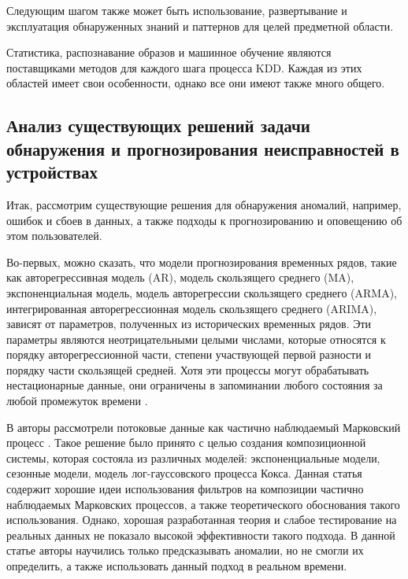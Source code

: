 Следующим шагом также может быть использование, развертывание и эксплуатация обнаруженных знаний и паттернов для целей предметной области.

Статистика, распознавание образов и машинное обучение являются поставщиками методов для каждого шага процесса KDD.
Каждая из этих областей имеет свои особенности, однако все они имеют также много общего.

\subsection{Анализ существующих решений задачи обнаружения и прогнозирования неисправностей в устройствах}

Итак, рассмотрим существующие решения для обнаружения аномалий, например, ошибок и сбоев в данных, а также
подходы к прогнозированию и оповещению об этом пользователей.

Во-первых, можно сказать, что модели прогнозирования временных рядов, такие как авторегрессивная модель (AR),
модель скользящего среднего (MA), экспоненциальная модель,
модель авторегрессии скользящего среднего (ARMA), 
интегрированная авторегрессионная модель скользящего среднего (ARIMA), 
зависят от параметров, полученных из исторических временных рядов. 
Эти параметры являются неотрицательными целыми числами, 
которые относятся к порядку авторегрессионной части, степени участвующей первой разности и порядку части скользящей средней. 
Хотя эти процессы могут обрабатывать нестационарные данные, 
они ограничены в запоминании любого состояния за любой промежуток времени \cite{nonlinear-series}. 

В \cite{3-paper} авторы рассмотрели потоковые данные как частично наблюдаемый Марковский процесс \cite{3-pomp}. 
Такое решение было принято с целью создания композиционной системы,
которая состояла из различных моделей: экспоненциальные модели, сезонные модели, модель лог-гауссовского процесса Кокса.
Данная статья содержит хорошие идеи использования фильтров на композиции частично наблюдаемых Марковских процессов, а также
теоретического обоснования такого использования. Однако, хорошая разработанная теория и слабое тестирование на реальных данных
не показало высокой эффективности такого подхода. В данной статье авторы научились только предсказывать аномалии,
но не смогли их определить, а также использовать данный подход в реальном времени.

